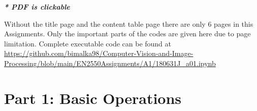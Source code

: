 \documentclass[a4paper,10pt]{article}%
\begin{document}

\tableofcontents

\begin{center}
	\textbf{\textit{* PDF is clickable}}\\
\end{center}


Without the title page and the content table page there are only 6 pages in this Assignments. Only the important parts of the codes are given here due to page limitation. Complete executable code can be found at \url{https://github.com/bimalka98/Computer-Vision-and-Image-Processing/blob/main/EN2550Assignments/A1/180631J_a01.ipynb}


\pagebreak
\section{Part 1: Basic Operations}
\end{document}
